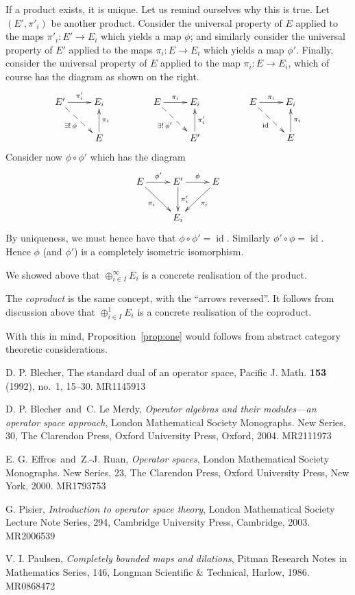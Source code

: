 \documentclass[a4paper,11pt]{article}
\theoremstyle{plain}
\theoremstyle{definition}
\newcommand{\id}{\operatorname{id}}
\begin{document}
If a product exists, it is unique.  Let us remind ourselves why this is true.  Let
$(E',\pi'_i)$ be another product.  Consider the universal property of $E$ applied to the
maps $\pi'_i:E'\rightarrow E_i$ which yields a map $\phi$; and similarly consider the universal
property of $E'$ applied to the maps $\pi_i:E\rightarrow E_i$ which yields a map $\phi'$.
Finally, consider the universal property of $E$ applied to the map $\pi_i:E\rightarrow E_i$,
which of course has the diagram as shown on the right.
\[ \xymatrix{ E' \ar[r]^-{\pi_i'} \ar@{-->}[rd]_-{\exists!\, \phi} & E_i \\
& E \ar[u]_-{\pi_i} }
\qquad\qquad
\xymatrix{ E \ar[r]^-{\pi_i} \ar@{-->}[rd]_-{\exists!\, \phi'} & E_i \\
& E' \ar[u]_-{\pi'_i} }
\qquad\qquad
\xymatrix{ E \ar[r]^-{\pi_i} \ar@{-->}[rd]_-{\id} & E_i \\
& E \ar[u]_-{\pi_i} } \]
Consider now $\phi \circ \phi'$ which has the diagram
\[ \xymatrix{ E \ar[r]^-{\phi'} \ar[rd]_-{\pi_i} &
E' \ar[r]^-{\phi} \ar[d]^-{\pi_i'} & E \ar[ld]^-{\pi_i} \\
& E_i } \]
By uniqueness, we must hence have that $\phi\circ\phi' = \id$.  Similarly
$\phi'\circ\phi = \id$.  Hence $\phi$ (and $\phi'$) is a completely isometric isomorphism.

We showed above that $\oplus_{i\in I}^\infty E_i$ is a concrete realisation of the product.

The \emph{coproduct} is the same concept, with the ``arrows reversed''.  It follows from
discussion above that $\oplus_{i\in I}^1 E_i$ is a concrete realisation of the coproduct.

With this in mind, Proposition~\ref{prop:one} would follows from abstract category
theoretic considerations.



\begin{thebibliography}{99}

 D. P. Blecher, The standard dual of an operator space, Pacific J. Math. {\bf 153} (1992), no.~1, 15--30. MR1145913

 D. P. Blecher\ and\ C. Le Merdy, {\it Operator algebras and their modules---an operator space approach}, London Mathematical Society Monographs. New Series, 30, The Clarendon Press, Oxford University Press, Oxford, 2004. MR2111973

 E. G. Effros\ and\ Z.-J. Ruan, {\it Operator spaces}, London Mathematical Society Monographs. New Series, 23, The Clarendon Press, Oxford University Press, New York, 2000. MR1793753

 G. Pisier, {\it Introduction to operator space theory}, London Mathematical Society Lecture Note Series, 294, Cambridge University Press, Cambridge, 2003. MR2006539

 V. I. Paulsen, {\it Completely bounded maps and dilations}, Pitman Research Notes in Mathematics Series, 146, Longman Scientific \& Technical, Harlow, 1986. MR0868472

\end{thebibliography}
\end{document}
